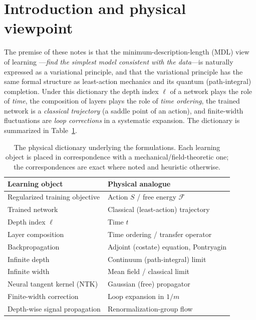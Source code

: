 \documentclass[11pt]{article}
\theoremstyle{definition}
\newcommand{\F}{\mathcal{F}}
\begin{document}
\tableofcontents

\section{Introduction and physical viewpoint}
\label{sec:intro}

The premise of these notes is that the minimum-description-length (MDL) view of learning
---\emph{find the simplest model consistent with the data}---is naturally expressed as a
variational principle, and that the variational principle has the same formal structure
as least-action mechanics and its quantum (path-integral) completion. Under this
dictionary the depth index $\ell$ of a network plays the role of \emph{time}, the
composition of layers plays the role of \emph{time ordering}, the trained network is a
\emph{classical trajectory} (a saddle point of an action), and finite-width fluctuations
are \emph{loop corrections} in a systematic expansion. The dictionary is summarized in
Table~\ref{tab:dictionary}.

\begin{table}[h]
\centering
\small
\begin{tabular}{ll}
\hline
\textbf{Learning object} & \textbf{Physical analogue}\\
\hline
Regularized training objective & Action $S$ / free energy $\F$\\
Trained network & Classical (least-action) trajectory\\
Depth index $\ell$ & Time $t$\\
Layer composition & Time ordering / transfer operator\\
Backpropagation & Adjoint (costate) equation, Pontryagin\\
Infinite depth & Continuum (path-integral) limit\\
Infinite width & Mean field / classical limit\\
Neural tangent kernel (NTK) & Gaussian (free) propagator\\
Finite-width correction & Loop expansion in $1/m$\\
Depth-wise signal propagation & Renormalization-group flow\\
\hline
\end{tabular}
\caption{The physical dictionary underlying the formulations. Each learning object is
placed in correspondence with a mechanical/field-theoretic one; the correspondences are
exact where noted and heuristic otherwise.}
\label{tab:dictionary}
\end{table}
\end{document}
